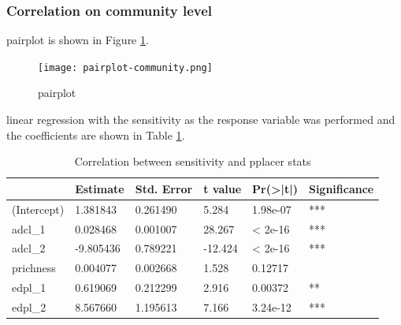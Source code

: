 \documentclass{article}
\begin{document}
\subsubsection{Correlation on community level}
pairplot is shown in Figure \ref{pairplot-communitylevel}.\par
\begin{figure}[H]
	\centering
	\texttt{[image: pairplot-community.png]}\\
	\caption{pairplot}
	\label{pairplot-communitylevel}
\end{figure}
linear regression with the sensitivity as the response variable was performed and the coefficients are shown in Table \ref{Tab:corresensitivity}. \par
\begin{table}[ht]
\caption{Correlation between sensitivity and pplacer stats}
\begin{tabular}{llllll}
\hline
            & Estimate &Std. Error &t value &Pr(>|t|) & Significance    \\
            \hline
(Intercept) & 1.381843 &  0.261490 &  5.284 &1.98e-07 &*** \\
adcl_1      & 0.028468 &  0.001007 & 28.267 & < 2e-16 &*** \\
adcl_2      &-9.805436 &  0.789221 &-12.424 & < 2e-16 &*** \\
prichness   & 0.004077 &  0.002668 &  1.528 & 0.12717 &    \\
edpl_1      & 0.619069 &  0.212299 &  2.916 & 0.00372 &**  \\
edpl_2      & 8.567660 &  1.195613 &  7.166 &3.24e-12 &*** \\
\hline
\end{tabular}
\label{Tab:corresensitivity}
\end{table}
\end{document}
